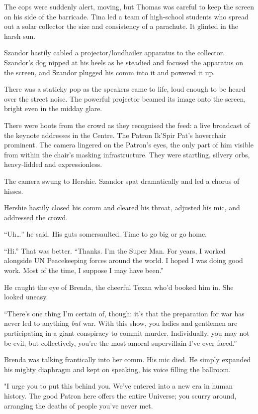 The cops were suddenly alert, moving, but Thomas was careful to
keep the screen on his side of the barricade. Tina led a team of
high-school students who spread out a solar collector the size and
consistency of a parachute. It glinted in the harsh sun.

Szandor hastily cabled a projector/loudhailer apparatus to the
collector. Szandor's dog nipped at his heels as he steadied and
focused the apparatus on the screen, and Szandor plugged his comm
into it and powered it up.

There was a staticky pop as the speakers came to life, loud enough
to be heard over the street noise. The powerful projector beamed
its image onto the screen, bright even in the midday glare.

There were hoots from the crowd as they recognised the feed: a live
broadcast of the keynote addresses in the Centre. The Patron
Ik'Spir Pat's hoverchair prominent. The camera lingered on the
Patron's eyes, the only part of him visible from within the chair's
masking infrastructure. They were startling, silvery orbs,
heavy-lidded and expressionless.

The camera swung to Hershie. Szandor spat dramatically and led a
chorus of hisses.

Hershie hastily closed his comm and cleared his throat, adjusted
his mic, and addressed the crowd.

\tb

``Uh\ldots{}'' he said. His guts somersaulted. Time to go big or go
home.

``Hi.'' That was better.
``Thanks. I'm the Super Man. For years, I worked alongside UN Peacekeeping 
forces around the world. I hoped I was doing good work. Most of the time, I 
suppose I may have been.''

He caught the eye of Brenda, the cheerful Texan who'd booked him
in. She looked uneasy.

``There's one thing I'm certain of, though: it's that the preparation for war 
has never led to anything \emph{but} war. With this show, you ladies and 
gentlemen are participating in a giant conspiracy to commit murder. 
Individually, you may not be evil, but collectively, you're the most amoral 
supervillain I've ever faced.''

Brenda was talking frantically into her comm. His mic died. He
simply expanded his mighty diaphragm and kept on speaking, his
voice filling the ballroom.

"I urge you to put this behind you. We've entered into a new era in
human history. The good Patron here offers the entire Universe; you
scurry around, arranging the deaths of people you've never met.

